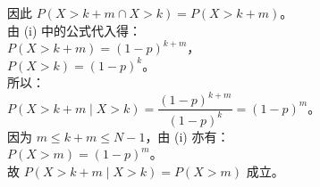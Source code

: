 {  因此 \(P(X > k+m \cap X > k) = P(X > k+m)\)。\\
  由 (i) 中的公式代入得：\\
  \(P(X > k+m) = (1 - p)^{k+m}\)，\\
  \(P(X > k) = (1 - p)^k\)。\\
  所以：\\
  \(P(X > k+m \mid X > k) = \dfrac{(1 - p)^{k+m}}{(1 - p)^k} = (1 - p)^m\)。\\
  因为 \(m \leqslant k+m \leqslant N-1\)，由 (i) 亦有：\\
  \(P(X > m) = (1 - p)^m\)。\\
  故 \(P(X > k+m \mid X > k) = P(X > m)\) 成立。%
}

\newcommand{\qStatsBasketballShootingDiagnosis}{%
  第一问中，学生极易在 \(X=4\) 的概率计算上出错（常错写为前 3 次未中、第 4 次中或不中，而多乘了 \(p\) 或 \(q\) 的系数）。必须注意，在截断几何分布中，最后一项的概率包含投满未中的情况，因此直接等于前 \(N-1\) 次均不中的概率 \(q^{N-1}\)。%
}

\newcommand{\qStatsBasketballShootingTeachingNotes}{%
  本题考查概率的核心概念。第二问本质上是在截断几何分布中证明其“无记忆性”（Memoryless Property）。讲评时，可以对比几何分布的原生无记忆性，强调只要限制次数 \(k+m \leqslant N-1\)，此性质在截断后依然成立，借此加深对条件概率的物理理解。%
}
